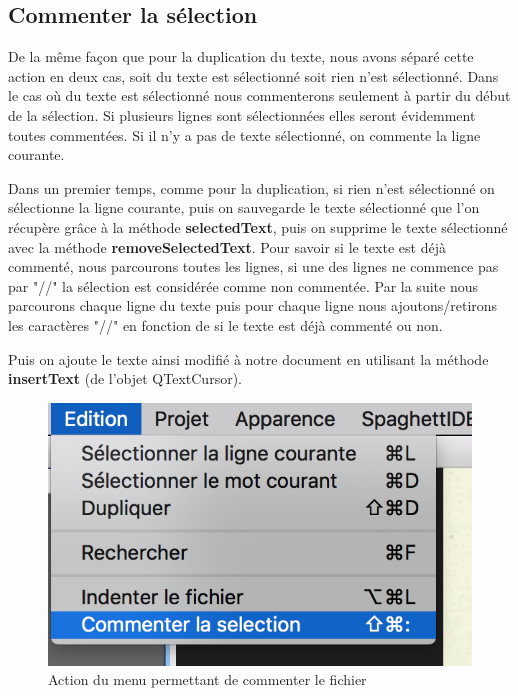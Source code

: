 \documentclass[a4paper,12pt]{article}
\begin{document}
	\newpage

	\subsection{Commenter la sélection}

	De la même façon que pour la duplication du texte, nous avons séparé cette action en deux cas, soit du texte est sélectionné soit rien n'est sélectionné.
	Dans le cas où du texte est sélectionné nous commenterons seulement à partir du début de la sélection. Si plusieurs lignes sont sélectionnées elles seront évidemment toutes commentées. Si il n'y a pas de texte sélectionné, on commente la ligne courante.

	Dans un premier temps, comme pour la duplication, si rien n'est sélectionné on sélectionne la ligne courante, puis on sauvegarde le texte sélectionné que l'on récupère grâce à la méthode \textbf{selectedText}, puis on supprime le texte sélectionné avec la méthode \textbf{removeSelectedText}. Pour savoir si le texte est déjà commenté, nous parcourons toutes les lignes, si une des lignes ne commence pas par "//" la sélection est considérée comme non commentée. Par la suite nous parcourons chaque ligne du texte puis pour chaque ligne nous ajoutons/retirons les caractères "//" en fonction de si le texte est déjà commenté ou non.

	Puis on ajoute le texte ainsi modifié à notre document en utilisant la méthode \textbf{insertText} (de l'objet QTextCursor).

	\begin{figure}[h!]

		\begin{center}
			\includegraphics[scale=0.7]{images/imgs_edit/utilisation_commentaire}
			\caption{Action du menu permettant de commenter le fichier}
		\end{center}
	\end{figure}
\end{document}
